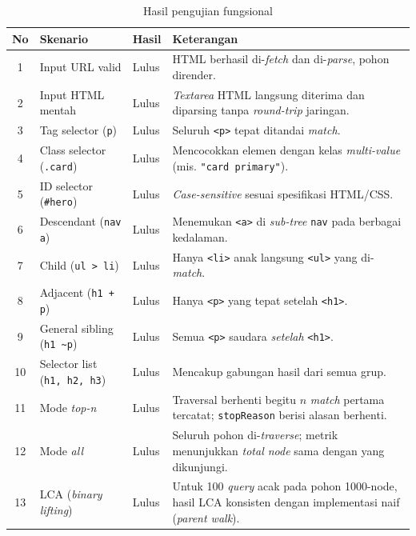 \begin{table}[H]
\centering
\caption{Hasil pengujian fungsional}
\begin{tabular}{|c|l|l|p{6.5cm}|}
\hline
\textbf{No} & \textbf{Skenario} & \textbf{Hasil} & \textbf{Keterangan} \\
\hline
1 & Input URL valid & Lulus & HTML berhasil di-\textit{fetch} dan di-\textit{parse}, pohon dirender. \\
\hline
2 & Input HTML mentah & Lulus & \textit{Textarea} HTML langsung diterima dan diparsing tanpa \textit{round-trip} jaringan. \\
\hline
3 & Tag selector (\texttt{p}) & Lulus & Seluruh \texttt{<p>} tepat ditandai \textit{match}. \\
\hline
4 & Class selector (\texttt{.card}) & Lulus & Mencocokkan elemen dengan kelas \textit{multi-value} (mis. \texttt{"card primary"}). \\
\hline
5 & ID selector (\texttt{\#hero}) & Lulus & \textit{Case-sensitive} sesuai spesifikasi HTML/CSS. \\
\hline
6 & Descendant (\texttt{nav a}) & Lulus & Menemukan \texttt{<a>} di \textit{sub-tree} \texttt{nav} pada berbagai kedalaman. \\
\hline
7 & Child (\texttt{ul > li}) & Lulus & Hanya \texttt{<li>} anak langsung \texttt{<ul>} yang di-\textit{match}. \\
\hline
8 & Adjacent (\texttt{h1 + p}) & Lulus & Hanya \texttt{<p>} yang tepat setelah \texttt{<h1>}. \\
\hline
9 & General sibling (\texttt{h1 \textasciitilde p}) & Lulus & Semua \texttt{<p>} saudara \textit{setelah} \texttt{<h1>}. \\
\hline
10 & Selector list (\texttt{h1, h2, h3}) & Lulus & Mencakup gabungan hasil dari semua grup. \\
\hline
11 & Mode \textit{top-n} & Lulus & Traversal berhenti begitu $n$ \textit{match} pertama tercatat; \texttt{stopReason} berisi alasan berhenti. \\
\hline
12 & Mode \textit{all} & Lulus & Seluruh pohon di-\textit{traverse}; metrik menunjukkan \textit{total node} sama dengan yang dikunjungi. \\
\hline
13 & LCA (\textit{binary lifting}) & Lulus & Untuk 100 \textit{query} acak pada pohon 1000-node, hasil LCA konsisten dengan implementasi naif (\textit{parent walk}). \\
\hline
\end{tabular}
\end{table}

